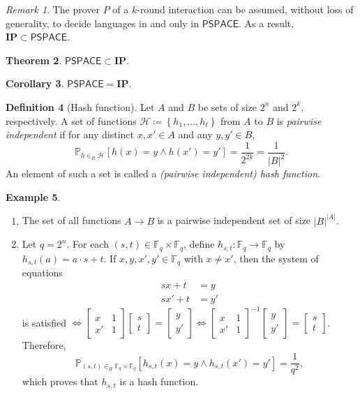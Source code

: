 \documentclass[10pt,letterpaper,cm]{nupset}
\theoremstyle{definition}
\newtheorem{definition}{Definition}[subsection]
\newtheorem{exmp}[definition]{Example}
\theoremstyle{theorem}
\newtheorem{theorem}[definition]{Theorem}
\newtheorem{corollary}[definition]{Corollary}
\theoremstyle{remark}
\newtheorem{remark}[definition]{Remark}
\newcommand{\F}{\mathbb F}
\renewcommand{\H}{\mathcal H}
\newcommand{\1}{\mathbf{1}}
\newcommand{\0}{\vec 0}
\begin{document}
\begin{remark}
The prover $P$ of a $k$-round interaction can be assumed, without loss of generality, to decide languages in and only in $\mathsf{PSPACE}$. As a result, $\mathbf{IP} \subset \mathsf{PSPACE}$.
\end{remark}

\begin{theorem}
$\mathsf{PSPACE} \subset \mathbf{IP}$.
\end{theorem}

\begin{corollary}
$\mathsf{PSPACE} = \mathbf{IP}$.
\end{corollary}

\begin{definition}[Hash function]
Let $A$ and $B$ be sets of size $2^n$ and $2^k$, respectively. A set of functions $\H\coloneqq \left\{h_1, \ldots, h_t\right\}$ from $A$ to $B$ is \textit{pairwise independent} if for any distinct $x, x' \in A$ and any $y, y' \in B$, $$  \mathbb{P}_{h \in_R \H}\left[h(x) = y \land h(x') = y'\right] = \frac{1}{2^{2k}}  = \frac{1}{\left\lvert{B}\right\rvert^2}.$$ An element of such a set is called a \textit{(pairwise independent) hash function}.
\end{definition}

\begin{exmp} $ $
\begin{enumerate}
\item The set of all functions $A \to B$ is a pairwise independent set of size $\left\lvert{B}\right\rvert^{\left\lvert{A}\right\rvert}$. 
\item
Let $q= 2^n$. For each $\left(s,t\right) \in \F_q \times \F_q$, define $h_{s,t} : \F_q \to \F_q$ by $h_{s,t}(a) = a \cdot s +t$. If $x,y, x', y' \in \F_q$ with $x \ne x'$, then the system of equations \begin{align*} 
sx + t & = y \\ sx' +t & = y'
\end{align*} 
is satisfied $\iff  \begin{bmatrix}  x & 1 \\ x' & 1   \end{bmatrix} \begin{bmatrix} s \\ t    \end{bmatrix} = \begin{bmatrix} y \\ y' \end{bmatrix} \iff  \begin{bmatrix}  x & 1 \\ x' & 1   \end{bmatrix}^{-1} \begin{bmatrix} y \\ y' \end{bmatrix}  = \begin{bmatrix} s \\ t    \end{bmatrix} $. Therefore, $$\mathbb{P}_{(s,t)\in_R \F_q\times \F_q}\left[h_{s,t}(x) = y \land h_{s,t}(x') = y'\right] = \frac{1}{q^2},$$ which proves that $h_{s,t}$ is a hash function.
\end{enumerate}
\end{exmp}
\end{document}
